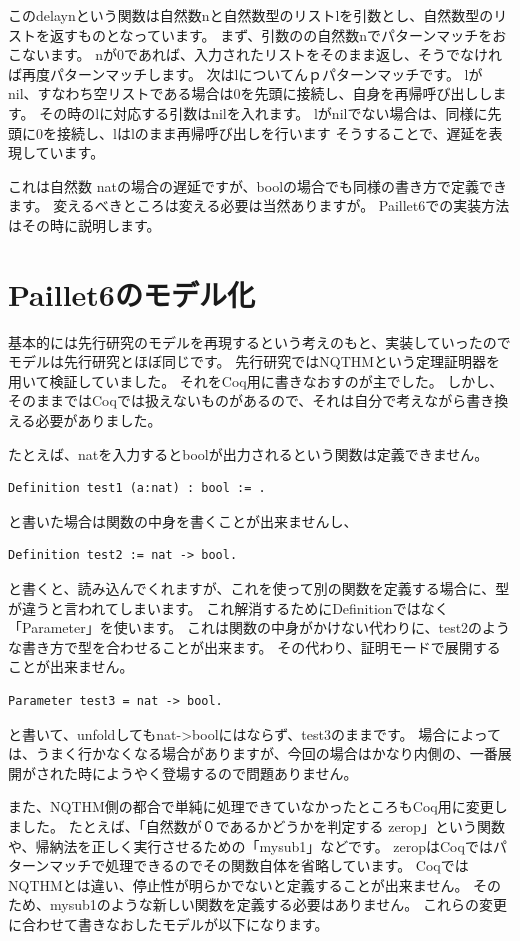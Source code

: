 \documentclass{jsbook}
\begin{document}
このdelaynという関数は自然数nと自然数型のリストlを引数とし、自然数型のリストを返すものとなっています。
まず、引数のの自然数nでパターンマッチをおこないます。
nが0であれば、入力されたリストをそのまま返し、そうでなければ再度パターンマッチします。
次はlについてんｐパターンマッチです。
lがnil、すなわち空リストである場合は0を先頭に接続し、自身を再帰呼び出しします。
その時のlに対応する引数はnilを入れます。
lがnilでない場合は、同様に先頭に0を接続し、lはlのまま再帰呼び出しを行います
そうすることで、遅延を表現しています。

これは自然数 natの場合の遅延ですが、boolの場合でも同様の書き方で定義できます。
変えるべきところは変える必要は当然ありますが。
Paillet6での実装方法はその時に説明します。
\section{Paillet6のモデル化}
基本的には先行研究のモデルを再現するという考えのもと、実装していったのでモデルは先行研究とほぼ同じです。
先行研究ではNQTHMという定理証明器を用いて検証していました。
それをCoq用に書きなおすのが主でした。
しかし、そのままではCoqでは扱えないものがあるので、それは自分で考えながら書き換える必要がありました。

たとえば、natを入力するとboolが出力されるという関数は定義できません。
\begin{verbatim}
Definition test1 (a:nat) : bool := .
\end{verbatim}
と書いた場合は関数の中身を書くことが出来ませんし、
\begin{verbatim}
Definition test2 := nat -> bool.
\end{verbatim}
と書くと、読み込んでくれますが、これを使って別の関数を定義する場合に、型が違うと言われてしまいます。
これ解消するためにDefinitionではなく「Parameter」を使います。
これは関数の中身がかけない代わりに、test2のような書き方で型を合わせることが出来ます。
その代わり、証明モードで展開することが出来ません。
\begin{verbatim}
Parameter test3 = nat -> bool.
\end{verbatim}
と書いて、unfoldしてもnat->boolにはならず、test3のままです。
場合によっては、うまく行かなくなる場合がありますが、今回の場合はかなり内側の、一番展開がされた時にようやく登場するので問題ありません。

また、NQTHM側の都合で単純に処理できていなかったところもCoq用に変更しました。
たとえば、「自然数が０であるかどうかを判定する zerop」という関数や、帰納法を正しく実行させるための「mysub1」などです。
zeropはCoqではパターンマッチで処理できるのでその関数自体を省略しています。
CoqではNQTHMとは違い、停止性が明らかでないと定義することが出来ません。
そのため、mysub1のような新しい関数を定義する必要はありません。
これらの変更に合わせて書きなおしたモデルが以下になります。
\end{document}
